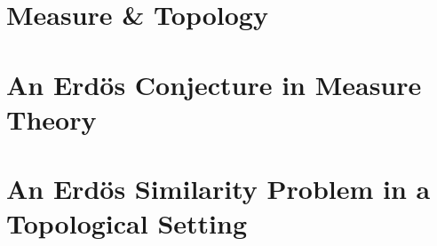 \documentclass[12pt,oneside]{sfsuthesis}
\begin{document}
\thesistitle


\chapter{Measure \& Topology}



\chapter{An Erd\"{o}s Conjecture in Measure Theory}


\chapter{An Erd\"{o}s Similarity Problem in a Topological Setting}





\printbibliography
\end{document}
